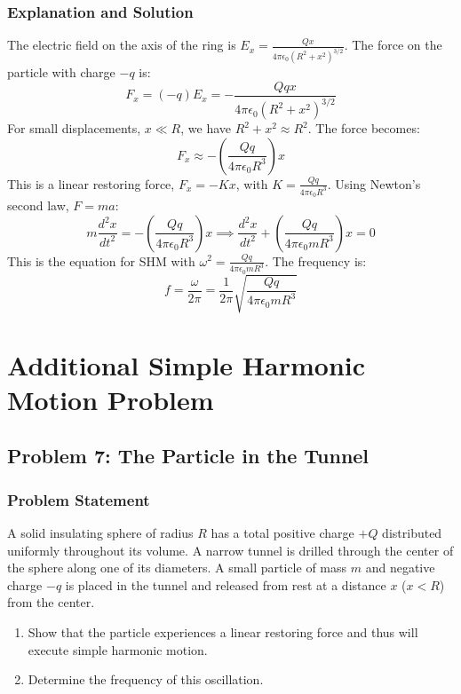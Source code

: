 \documentclass{article}
\begin{document}
\subsubsection*{Explanation and Solution}
The electric field on the axis of the ring is $E_x = \frac{Qx}{4\pi\epsilon_0(R^2 + x^2)^{3/2}}$.
The force on the particle with charge $-q$ is:
$$ F_x = (-q)E_x = -\frac{Qqx}{4\pi\epsilon_0(R^2 + x^2)^{3/2}} $$
For small displacements, $x \ll R$, we have $R^2+x^2 \approx R^2$. The force becomes:
$$ F_x \approx -\left(\frac{Qq}{4\pi\epsilon_0 R^3}\right)x $$
This is a linear restoring force, $F_x = -Kx$, with $K = \frac{Qq}{4\pi\epsilon_0 R^3}$.
Using Newton's second law, $F = ma$:
$$ m\frac{d^2x}{dt^2} = -\left(\frac{Qq}{4\pi\epsilon_0 R^3}\right)x \implies \frac{d^2x}{dt^2} + \left(\frac{Qq}{4\pi\epsilon_0 mR^3}\right)x = 0 $$
This is the equation for SHM with $\omega^2 = \frac{Qq}{4\pi\epsilon_0 mR^3}$. The frequency is:
$$ f = \frac{\omega}{2\pi} = \frac{1}{2\pi}\sqrt{\frac{Qq}{4\pi\epsilon_0 mR^3}} $$

\newpage
\section{Additional Simple Harmonic Motion Problem}

\subsection{Problem 7: The Particle in the Tunnel}
\subsubsection*{Problem Statement}
A solid insulating sphere of radius $R$ has a total positive charge $+Q$ distributed uniformly throughout its volume. A narrow tunnel is drilled through the center of the sphere along one of its diameters. A small particle of mass $m$ and negative charge $-q$ is placed in the tunnel and released from rest at a distance $x$ ($x < R$) from the center.

\begin{enumerate}
    \item[(a)] Show that the particle experiences a linear restoring force and thus will execute simple harmonic motion.
    \item[(b)] Determine the frequency of this oscillation.
\end{enumerate}
\end{document}

